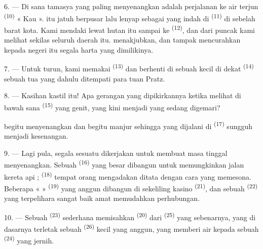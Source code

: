 \VUsaut{3.0mm}
\VUsaut{3.0mm}

6. --- Di sana tamasya yang paling menyenangkan adalah perjalanan ke
air terjun \textsuperscript{(10)} « Kau ».  itu
jatuh berpusar lalu lenyap sebagai  yang indah di
 \textsuperscript{(11)} di sebelah barat kota.
Kami mendaki lewat hutan itu sampai ke 
\textsuperscript{(12)}, dan dari puncak  kami
melihat sekilas seluruh  daerah itu.
 menakjubkan, dan  tampak
mencurahkan kepada negeri itu segala harta yang dimilikinya.

7. --- Untuk turun, kami memakai 
\textsuperscript{(13)} dan berhenti di sebuah  kecil di
dekat  \textsuperscript{(14)} sebuah  tua yang dahulu ditempati para tuan Pratz.

8. --- Kasihan kastil itu! Apa gerangan yang dipikirkannya ketika
melihat di bawah sana  \textsuperscript{(15)}
yang genit, yang kini menjadi  yang
sedang digemari?

 begitu menyenangkan dan 
begitu manjur sehingga  yang dijalani di
 \textsuperscript{(17)} sungguh menjadi kesenangan.

\VUsaut{3.0mm}
\VUsaut{3.0mm}

9. --- Lagi pula, segala sesuatu dikerjakan untuk membuat masa tinggal
menyenangkan. Sebuah  \textsuperscript{(16)}
yang besar dibangun untuk memungkinkan jalan kereta api ;
 \textsuperscript{(18)}  tempat
orang mengadakan  ditata dengan cara yang memesona.
Beberapa «  » \textsuperscript{(19)} yang anggun dibangun
di sekeliling kasino \textsuperscript{(21)}, dan sebuah  \textsuperscript{(22)} yang terpelihara sangat baik amat
memudahkan perhubungan.

10. --- Sebuah  \textsuperscript{(23)} sederhana
memisahkan  \textsuperscript{(20)} dari 
\textsuperscript{(25)} yang sebenarnya, yang di dasarnya terletak
sebuah  \textsuperscript{(26)} kecil yang anggun, yang
memberi air kepada sebuah  \textsuperscript{(24)}
yang jernih.

